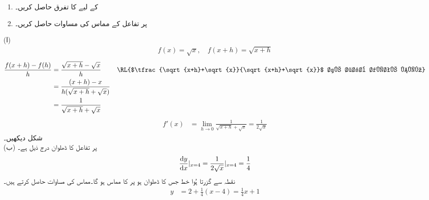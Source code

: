 \begin{enumerate}[1.]

\item
{} کے لیے  کا تفرق حاصل کریں۔
\item
{} پر تفاعل  کے مماس کی مساوات حاصل کریں۔
\end{enumerate}
(ا) \quad {}\quad
\begin{align*}
f(x)=\sqrt{x},\quad f(x+h)=\sqrt{x+h}
\end{align*}
\begin{align*}
\frac{f(x+h)-f(h)}{h}&=\frac{\sqrt{x+h}-\sqrt{x}}{h}&& \text{\RL{$\tfrac{\sqrt{x+h}+\sqrt{x}}{\sqrt{x+h}+\sqrt{x}}$ سے ضرب دیتے ہیں}}\\
&=\frac{(x+h)-x}{h(\sqrt{x+h}+\sqrt{x})}\\
&=\frac{1}{\sqrt{x+h}+\sqrt{x}}
\end{align*}
\begin{align*}
f'(x)&=\lim_{h\to 0}\frac{1}{\sqrt{x+h}+\sqrt{x}}=\frac{1}{2\sqrt{x}}
\end{align*}
شکل  دیکھیں۔\\
(ب)\quad
{} پر تفاعل کا ڈھلوان درج ذیل ہے۔
\begin{align*}
\frac{\dif y}{\dif x}|_{x=4}=\frac{1}{2\sqrt{x}}|_{x=4}=\frac{1}{4}
\end{align*}
نقطہ  سے گزرتا ہُوا خط جس کا  ڈھلوان  ہو  پر  کا مماس ہو گا۔مماس کی مساوات حاصل کرتے ہیں۔
\begin{align*}
y&=2+\frac{1}{4}(x-4)=\frac{1}{4}x+1
\end{align*}
%
